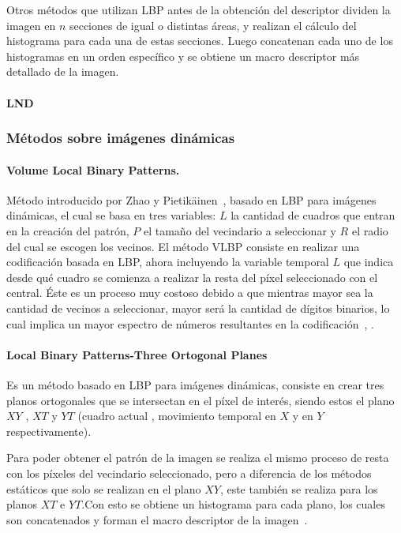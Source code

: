 Otros métodos que utilizan LBP antes de la obtención del descriptor dividen la imagen en $n$ secciones de igual o distintas áreas, y realizan el cálculo del histograma para cada una de estas secciones. Luego concatenan cada uno de los histogramas en un orden específico y se obtiene un macro descriptor más detallado de la imagen.

		\paragraph{LND}
		\label{sec:lnd}

	\subsubsection{Métodos sobre imágenes dinámicas}	
	\label{sec:met_videos}

		\paragraph{Volume Local Binary Patterns.}
		\label{sec:vlbp}
		Método introducido por Zhao y Pietikäinen~\cite{Zhao2006}, basado en LBP para imágenes dinámicas, el cual se basa en tres variables: $L$ la cantidad de cuadros que entran en la creación del patrón, $P$ el tamaño del vecindario a seleccionar y $R$ el radio del cual se escogen los vecinos. 
El método VLBP consiste en realizar una codificación basada en LBP, ahora incluyendo la variable temporal $L$ que indica desde qué cuadro se comienza a realizar la resta del píxel seleccionado con el central.
Éste es un proceso muy costoso debido a que mientras mayor sea la cantidad de vecinos a seleccionar, mayor será la cantidad de dígitos binarios, lo cual implica un mayor espectro de números resultantes en la codificación~\cite{Zhao2007a}, \cite{Zhao2007}.

		\paragraph{Local Binary Patterns-Three Ortogonal Planes}
		\label{sec:lbp-top}
		 Es un método basado en LBP para imágenes dinámicas, consiste en crear tres planos ortogonales que se intersectan en el píxel de interés, siendo estos el plano $XY$ , $XT$ y $YT$ (cuadro actual , movimiento temporal en $X$ y en $Y$ respectivamente). 

Para poder obtener el patrón de la imagen se realiza el mismo proceso de resta con los píxeles del vecindario seleccionado, pero a diferencia de los métodos estáticos que solo se realizan en el plano $XY$, este también se realiza para los planos $XT$ e $YT$.\@ Con esto se obtiene un histograma para cada plano, los cuales son concatenados y forman el macro descriptor de la imagen~\cite{Zhao2007}.


